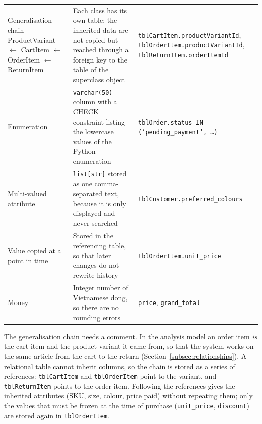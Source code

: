 {\begin{xltabular}{\textwidth}{@{}L{3.3cm} Y L{4.2cm}@{}}
Generalisation chain \textsf{ProductVariant} $\leftarrow$ \textsf{CartItem} $\leftarrow$ \textsf{OrderItem} $\leftarrow$ \textsf{ReturnItem} & Each class has its own table; the inherited data are not copied but reached through a foreign key to the table of the superclass object & \texttt{tblCartItem.\allowbreak productVariantId}, \texttt{tblOrderItem.\allowbreak productVariantId}, \texttt{tblReturnItem.\allowbreak orderItemId} \\
Enumeration & \texttt{varchar(50)} column with a CHECK constraint listing the lowercase values of the Python enumeration & \texttt{tblOrder.\allowbreak status IN ('pending\_payment', \ldots)} \\
Multi-valued attribute & \texttt{list[str]} stored as one comma-separated text, because it is only displayed and never searched & \texttt{tblCustomer.\allowbreak preferred\_colours} \\
Value copied at a point in time & Stored in the referencing table, so that later changes do not rewrite history & \texttt{tblOrderItem.\allowbreak unit\_price} \\
Money & Integer number of Vietnamese dong, so there are no rounding errors & \texttt{price}, \texttt{grand\_total} \\
\end{xltabular}
}

The generalisation chain needs a comment. In the analysis model an order item \emph{is} the cart item and the product variant it came from, so that the system works on the same article from the cart to the return (Section~\ref{subsec:relationships}). A relational table cannot inherit columns, so the chain is stored as a series of references: \texttt{tblCartItem} and \texttt{tblOrderItem} point to the variant, and \texttt{tblReturnItem} points to the order item. Following the references gives the inherited attributes (SKU, size, colour, price paid) without repeating them; only the values that must be frozen at the time of purchase (\texttt{unit\_price}, \texttt{discount}) are stored again in \texttt{tblOrderItem}.

